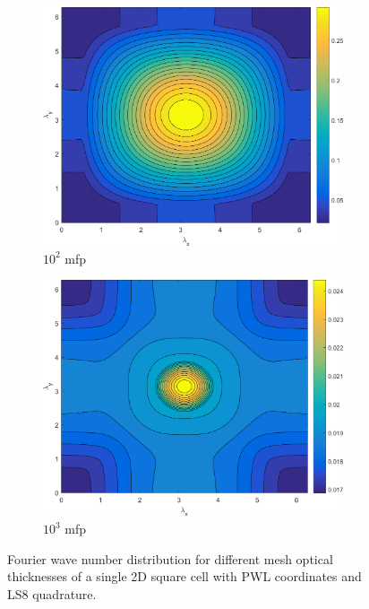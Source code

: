 \begin{figure}
{\begin{subfigure}[b]{0.485\textwidth}
		\centering
		\includegraphics[width=0.975\textwidth]{figures/sec_DSA/SI_MIP_C=4_UPWLD1_LS8_x=100_dydx=1_contour.png}
		\caption{$10^{2}$ mfp}
	\end{subfigure}
	\hfill
	\begin{subfigure}[b]{0.485\textwidth}
		\centering
		\includegraphics[width=0.975\textwidth]{figures/sec_DSA/SI_MIP_C=4_UPWLD1_LS8_x=1000_dydx=1_contour.png}
		\caption{$10^{3}$ mfp}
	\end{subfigure}
	}
\caption{Fourier wave number distribution for different mesh optical thicknesses of a single 2D square cell with PWL coordinates and LS8 quadrature.}
\label{fig::2D_homo_dsa_wave_LS8}
\end{figure}

